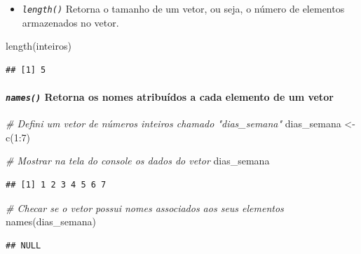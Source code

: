 \documentclass[
]{article}
\newenvironment{Shaded}{\begin{snugshade}}{\end{snugshade}}
\newcommand{\CommentTok}[1]{\textcolor[rgb]{0.56,0.35,0.01}{\textit{#1}}}
\newcommand{\DecValTok}[1]{\textcolor[rgb]{0.00,0.00,0.81}{#1}}
\newcommand{\FunctionTok}[1]{\textcolor[rgb]{0.00,0.00,0.00}{#1}}
\newcommand{\NormalTok}[1]{#1}
\newcommand{\OtherTok}[1]{\textcolor[rgb]{0.56,0.35,0.01}{#1}}
\newcommand{\SpecialCharTok}[1]{\textcolor[rgb]{0.00,0.00,0.00}{#1}}
\providecommand{\tightlist}{%
  \setlength{\itemsep}{0pt}\setlength{\parskip}{0pt}}
\begin{document}
\begin{itemize}
\tightlist
\item
  \emph{\texttt{length()}} Retorna o tamanho de um vetor, ou seja, o
  número de elementos armazenados no vetor.
\end{itemize}

\begin{Shaded}
\begin{Highlighting}[]
\FunctionTok{length}\NormalTok{(inteiros)}
\end{Highlighting}
\end{Shaded}

\begin{verbatim}
## [1] 5
\end{verbatim}

\hypertarget{names-retorna-os-nomes-atribuuxeddos-a-cada-elemento-de-um-vetor}{%
\paragraph{\texorpdfstring{\emph{\texttt{names()}} Retorna os nomes
atribuídos a cada elemento de um
vetor}{names() Retorna os nomes atribuídos a cada elemento de um vetor}}\label{names-retorna-os-nomes-atribuuxeddos-a-cada-elemento-de-um-vetor}}

\begin{Shaded}
\begin{Highlighting}[]
\CommentTok{\# Defini um vetor de números inteiros chamado "dias\_semana"}
\NormalTok{dias\_semana }\OtherTok{\textless{}{-}} \FunctionTok{c}\NormalTok{(}\DecValTok{1}\SpecialCharTok{:}\DecValTok{7}\NormalTok{)}

\CommentTok{\# Mostrar na tela do console os dados do vetor}
\NormalTok{dias\_semana}
\end{Highlighting}
\end{Shaded}

\begin{verbatim}
## [1] 1 2 3 4 5 6 7
\end{verbatim}

\begin{Shaded}
\begin{Highlighting}[]
\CommentTok{\# Checar se o vetor possui nomes associados aos seus elementos}
\FunctionTok{names}\NormalTok{(dias\_semana)}
\end{Highlighting}
\end{Shaded}

\begin{verbatim}
## NULL
\end{verbatim}
\end{document}
